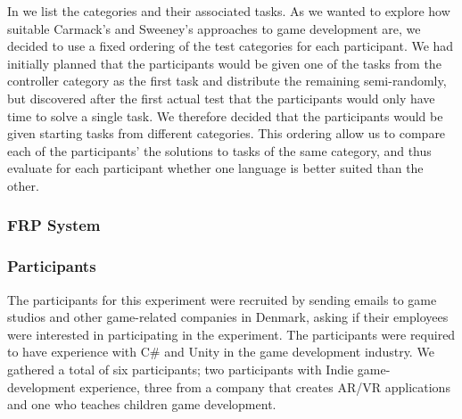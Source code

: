 

 In  we list the categories and their associated tasks. As we wanted to explore how suitable Carmack's and Sweeney's approaches to game development are, we decided to use a fixed ordering of the test categories for each participant. We had initially planned that the participants would be given one of the tasks from the controller category as the first task and distribute the remaining semi-randomly, but discovered after the first actual test that the participants would only have time to solve a single task. We therefore decided that the participants would be given starting tasks from different categories. This ordering allow us to compare each of the participants' the solutions to tasks of the same category, and thus evaluate for each participant whether one language is better suited than the other.

\subsubsection{FRP System}\label{sec:frp-sys}


\subsubsection{Participants} \label{sec:par-crit}
The participants for this experiment were recruited by sending emails to game studios and other game-related companies in Denmark, asking if their employees were interested in participating in the experiment. The participants were required to have experience with C\# and Unity in the game development industry. We gathered a total of six participants; two participants with Indie game-development experience, three from a company that creates \gls{AR}/\gls{VR} applications and one who teaches children game development.

